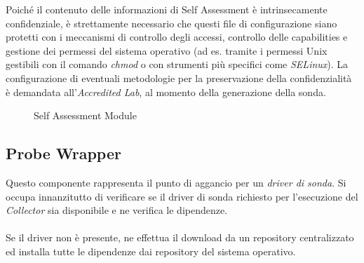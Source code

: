 \documentclass[../main.tex]{subfiles}
\begin{document}
Poiché il contenuto delle informazioni di Self Assessment è intrinsecamente confidenziale, è strettamente necessario che questi file di configurazione siano protetti con i meccanismi di controllo degli accessi, controllo delle capabilities e gestione dei permessi del sistema operativo (ad es. tramite i permessi Unix gestibili con il comando \textit{chmod} o con strumenti più specifici come \textit{SELinux}).
La configurazione di eventuali metodologie per la preservazione della confidenzialità è demandata all'\textit{Accredited Lab}, al momento della generazione della sonda.
\begin{figure}[H]
\centering
{}
\caption{Self Assessment Module}\label{fig:SelfAssessment}
\end{figure}
\newpage
\subsection {Probe Wrapper}
Questo componente rappresenta il punto di aggancio per un \textit{driver di sonda}.
Si occupa innanzitutto di verificare se il driver di sonda richiesto per l'esecuzione del \textit{Collector} sia disponibile e ne verifica le dipendenze.

\paragraph{}
Se il driver non è presente, ne effettua il download da un repository centralizzato ed installa tutte le dipendenze dai repository del sistema operativo.
\end{document}
